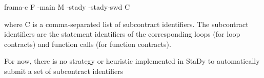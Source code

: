 \documentclass[web]{frama-c-book}
\begin{document}
\begin{shell}
  frama-c F -main M -stady -stady-swd C
\end{shell}

where C is a comma-separated list of subcontract identifiers. The subcontract identifiers are the statement identifiers of the corresponding loops (for loop contracts) and function calls (for function contracts).

For now, there is no strategy or heuristic implemented in StaDy to automatically submit a set of subcontract identifiers



\appendix



\cleardoublepage
{}
{}




\cleardoublepage
{}
{}
\listoffigures


\cleardoublepage
{}
{}
\printindex
\end{document}
